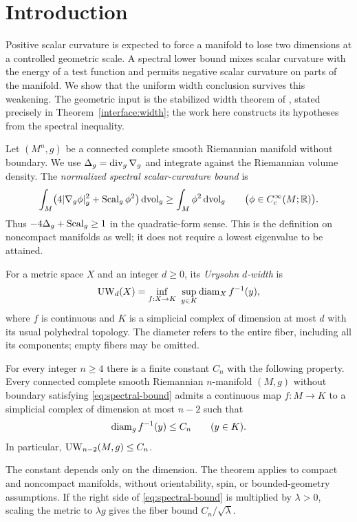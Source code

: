 \section{Introduction}\label{sec:intro}

Positive scalar curvature is expected to force a manifold to lose two
dimensions at a controlled geometric scale. A spectral lower bound
mixes scalar curvature with the energy of a test function and permits
negative scalar curvature on parts of the manifold. We show that the
uniform width conclusion survives this weakening. The geometric input
is the stabilized width theorem of \cite{OpenAIWidth}, stated precisely
in Theorem~\ref{interface:width}; the work here constructs its hypotheses
from the spectral inequality.

Let $(M^n,g)$ be a connected complete smooth Riemannian manifold without
boundary. We use $\Delta_g=\operatorname{div}_g\nabla_g$ and integrate against the
Riemannian volume density. The \emph{normalized spectral scalar-curvature
bound} is
\begin{equation}\label{eq:spectral-bound}
 \int_M\bigl(4|\nabla_g\phi|_g^2+\operatorname{Scal}_g\phi^2\bigr)\,\mathrm d\mathrm{vol}_g
 \ge \int_M\phi^2\,\mathrm d\mathrm{vol}_g
 \qquad\bigl(\phi\in C_c^\infty(M;\mathbb R)\bigr).
\end{equation}
Thus $-4\Delta_g+\operatorname{Scal}_g\ge1$ in the quadratic-form sense. This is
the definition on noncompact manifolds as well; it does not require
a lowest eigenvalue to be attained.

For a metric space $X$ and an integer $d\ge0$, its \emph{Urysohn
$d$-width} is
\[
 \operatorname{UW}_d(X)=\inf_{f:X\to K}\ \sup_{y\in K}\operatorname{diam}_X f^{-1}(y),
\]
where $f$ is continuous and $K$ is a simplicial complex of dimension
at most $d$ with its usual polyhedral topology. The diameter refers
to the entire fiber, including all its components; empty fibers may
be omitted.

\begin{theorem}\label{thm:main}
For every integer $n\ge4$ there is a finite constant $C_n$ with the
following property. Every connected complete smooth Riemannian
$n$-manifold $(M,g)$ without boundary satisfying
\eqref{eq:spectral-bound} admits a continuous map $f:M\to K$ to a
simplicial complex of dimension at most $n-2$ such that
\[
 \operatorname{diam}_g f^{-1}(y)\le C_n\qquad(y\in K).
\]
In particular, $\operatorname{UW}_{n-2}(M,g)\le C_n$.
\end{theorem}

The constant depends only on the dimension. The theorem applies to
compact and noncompact manifolds, without orientability, spin, or
bounded-geometry assumptions. If the right side of
\eqref{eq:spectral-bound} is multiplied by $\lambda>0$, scaling the
metric to $\lambda g$ gives the fiber bound $C_n/\sqrt\lambda$.

